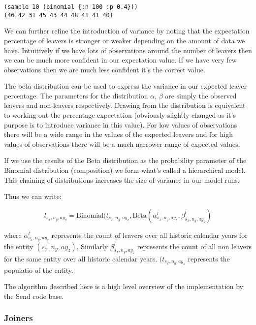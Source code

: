 \documentclass[margin=5mm]{article}
\begin{document}
\begin{lstlisting}
(sample 10 (binomial {:n 100 :p 0.4}))
(46 42 31 45 43 44 48 41 41 40)
\end{lstlisting}

We can further refine the introduction of variance by noting that the
expectation percentage of leavers is stronger or weaker depending
on the amount of data we have.  Intuitively if we have lots of
observations around the number of leavers then we can be much more
confident in our expectation value.  If we have very few observations
then we are much less confident it's the correct value.

The beta distribution can be used to express the variance in our
expected leaver percentage.  The parameters for the distribution
$\alpha$, $\beta$ are simply the observed leavers and non-leavers
respectively.  Drawing from the distribution is equivalent to working
out the percentage expectation (obviously slightly changed as it's
purpose is to introduce variance in this value).  For low values of
observations there will be a wide range in the values of the expected
leavers and for high values of observations there will be a much
narrower range of expected values.

If we use the results of the Beta distribution as the probability
parameter of the Binomial distribution (composition) we form what's
called a hierarchical model.  This chaining of distributions increases
the size of variance in our model runs.

Thus we can write:

\begin{equation*}
l_{s_x,n_y,ay_z} = \text{Binomial}(t_{s_x,n_y,ay_z},
\text{Beta}(\alpha^l_{s_x,n_y,ay_z}, \beta^l_{s_x,n_y,ay_z})
\end{equation*}

where $\alpha^l_{s_x,n_y,ay_z}$ represents the count of leavers over
all historic calendar years for the entity $({s_x,n_y,ay_z})$.
Similarly $\beta^l_{s_x,n_y,ay_z}$ represents the count of all non
leavers for the same entity over all historic calendar years.
$(t_{s_x,n_y,ay_z}$ represents the populatio of the entity.

The algorithm described here is a high level overview of the
implementation by the Send code base.

\subsubsection{Joiners}
\end{document}
